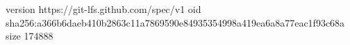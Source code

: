 version https://git-lfs.github.com/spec/v1
oid sha256:a366b6daeb410b2863c11a7869590e84935354998a419ea6a8a77eac1f93c68a
size 174888
